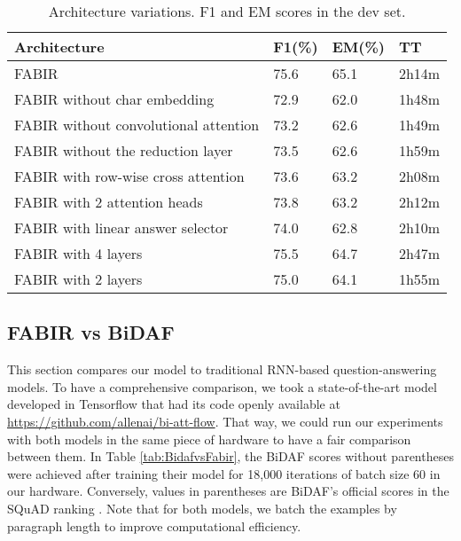 \documentclass[conference, letterpaper, 10pt]{IEEEtran}
\newcommand\Tstrut{\rule{0pt}{2.6ex}}
\begin{document}
\begin{table}[h!]
    \centering
    \caption{Architecture variations. F1 and EM scores in the dev set.}
    \begin{tabular}{| p{4.5cm} ||p{0.8cm}|p{0.8cm}|p{0.7cm}|}
        \hline\Tstrut
        \textbf{Architecture} &\textbf{F1(\%)} &\textbf{EM(\%)} & \textbf{TT} \\ [0.5ex] 
        \hline
        \hline
         FABIR & 75.6 &  65.1& 2h14m
        \\\hline 
        FABIR without char embedding & 72.9 & 62.0  & 1h48m
        \\\hline FABIR without convolutional attention & 73.2 & 62.6  & 1h49m
        \\\hline FABIR without the reduction layer & 73.5& 62.6 & 1h59m
        \\\hline FABIR with row-wise cross attention & 73.6 & 63.2 & 2h08m
        \\\hline FABIR with 2 attention heads & 73.8 & 63.2  & 2h12m
        \\\hline FABIR with linear answer selector & 74.0 & 62.8 & 2h10m
        \\\hline FABIR with 4 layers  & 75.5 & 64.7  & 2h47m
        \\\hline FABIR with 2 layers  & 75.0 & 64.1  & 1h55m
        \\\hline
    \end{tabular}
    \label{tab:tests}
\end{table}

\subsection{FABIR vs BiDAF}
This section compares our model to traditional RNN-based question-answering models.
To have a comprehensive comparison, we took a state-of-the-art model \cite{Seo2016} developed in Tensorflow \cite{GoogleResearch2015} that had its code openly available at \url{https://github.com/allenai/bi-att-flow}. That way, we could run our experiments with both models in the same piece of hardware to have a fair comparison between them. In Table \ref{tab:BidafvsFabir}, the BiDAF scores without parentheses were achieved after training their model for 18,000 iterations of batch size 60 in our hardware. Conversely, values in parentheses are BiDAF's official scores in the SQuAD ranking \cite{squad-website}.
Note that for both models, we batch the examples by paragraph length to improve computational efficiency.
\end{document}
